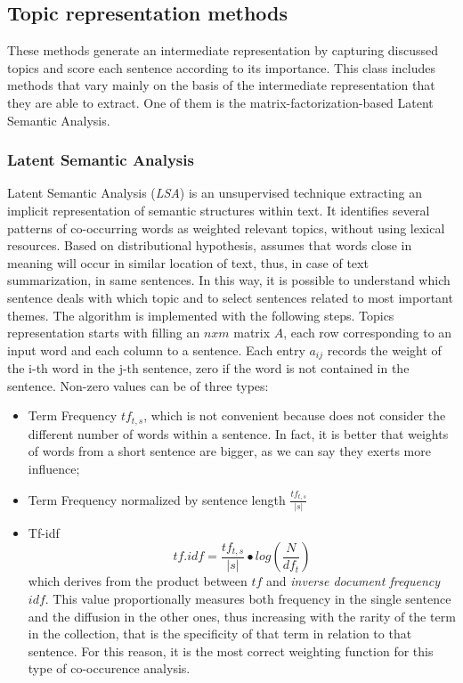 \documentclass[fleqn,10pt]{SelfArx} %
\begin{document}
\subsection{Topic representation methods}
These methods generate an intermediate representation by capturing discussed topics and score each sentence according to its importance. This class includes methods that vary mainly on the basis of the intermediate representation that they are able to extract. One of them is the matrix-factorization-based Latent Semantic Analysis.
\subsubsection{Latent Semantic Analysis}
Latent Semantic Analysis (\textit{LSA}) is an unsupervised technique extracting an implicit representation of semantic structures within text. It identifies several patterns of co-occurring words as weighted relevant topics, without using lexical resources. Based on distributional hypothesis, assumes that words close in meaning will occur in similar location of text, thus, in case of text summarization, in same sentences. In this way, it is possible to understand which sentence deals with which topic and to select sentences related to most important themes.
The algorithm is implemented with the following steps. Topics representation starts with filling an $nxm$ matrix $A$, each row corresponding to an input word and each column to a sentence. Each entry $a_{ij}$ records the weight of the i-th word in the j-th sentence, zero if the word is not contained in the sentence. Non-zero values can be of three types:
\begin{itemize}
  \item Term Frequency $tf_{t,s}$, which is not convenient because does not consider the different number of words within a sentence. In fact, it is better that weights of words from a short sentence are bigger, as we can say they exerts more influence;
  \item Term Frequency normalized by sentence length $\frac{tf_{t,s}}{|s|}$
  \item Tf-idf $$tf.idf=\frac{tf_{t,s}}{|s|}\bullet log(\frac{N}{df_t})$$ which derives from the product between $tf$ and \textit{inverse document frequency} $idf$. This value proportionally measures both frequency in the single sentence and the diffusion in the other ones, thus increasing with the rarity of the term in the collection, that is the specificity of that term in relation to that sentence. For this reason, it is the most correct weighting function for this type of co-occurence analysis.  
\end{itemize}
\end{document}
